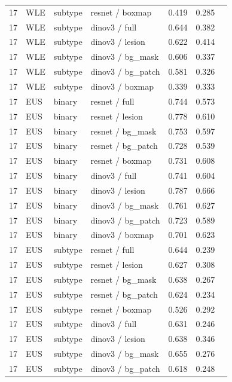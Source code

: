 \begin{longtable}{cL{1.1cm}L{1.5cm}L{5.6cm}ccc}
17 & WLE & subtype & resnet / boxmap & 0.419 & 0.285 & \nl{} \\
17 & WLE & subtype & dinov3 / full & 0.644 & 0.382 & \nl{} \\
17 & WLE & subtype & dinov3 / lesion & 0.622 & 0.414 & \nl{} \\
17 & WLE & subtype & dinov3 / bg\_mask & 0.606 & 0.337 & \nl{} \\
17 & WLE & subtype & dinov3 / bg\_patch & 0.581 & 0.326 & \nl{} \\
17 & WLE & subtype & dinov3 / boxmap & 0.339 & 0.333 & \nl{} \\
17 & EUS & binary & resnet / full & 0.744 & 0.573 & \nl{} \\
17 & EUS & binary & resnet / lesion & 0.778 & 0.610 & \nl{} \\
17 & EUS & binary & resnet / bg\_mask & 0.753 & 0.597 & \nl{} \\
17 & EUS & binary & resnet / bg\_patch & 0.728 & 0.539 & \nl{} \\
17 & EUS & binary & resnet / boxmap & 0.731 & 0.608 & \nl{} \\
17 & EUS & binary & dinov3 / full & 0.741 & 0.604 & \nl{} \\
17 & EUS & binary & dinov3 / lesion & 0.787 & 0.666 & \nl{} \\
17 & EUS & binary & dinov3 / bg\_mask & 0.761 & 0.627 & \nl{} \\
17 & EUS & binary & dinov3 / bg\_patch & 0.723 & 0.589 & \nl{} \\
17 & EUS & binary & dinov3 / boxmap & 0.701 & 0.623 & \nl{} \\
17 & EUS & subtype & resnet / full & 0.644 & 0.239 & \nl{} \\
17 & EUS & subtype & resnet / lesion & 0.627 & 0.308 & \nl{} \\
17 & EUS & subtype & resnet / bg\_mask & 0.638 & 0.267 & \nl{} \\
17 & EUS & subtype & resnet / bg\_patch & 0.624 & 0.234 & \nl{} \\
17 & EUS & subtype & resnet / boxmap & 0.526 & 0.292 & \nl{} \\
17 & EUS & subtype & dinov3 / full & 0.631 & 0.246 & \nl{} \\
17 & EUS & subtype & dinov3 / lesion & 0.638 & 0.346 & \nl{} \\
17 & EUS & subtype & dinov3 / bg\_mask & 0.655 & 0.276 & \nl{} \\
17 & EUS & subtype & dinov3 / bg\_patch & 0.618 & 0.248 & \nl{} \\

\end{longtable}
